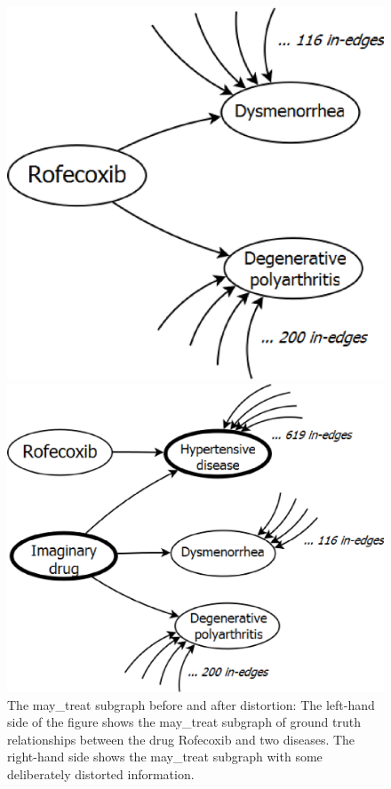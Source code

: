 \begin{figure}[tbh]
\begin{minipage}[c]{0.49\textwidth}\centering
\includegraphics[width=.52\textwidth]{fig/may_treat.eps}
\end{minipage}
\begin{minipage}[c]{0.49\textwidth}\centering
\includegraphics[width=.72\textwidth]{fig/may_treat_augmented.eps}
\end{minipage}
\caption[The may\_treat subgraph]{\label{fig:may_treat} The may\_treat subgraph before and after distortion: The left-hand side of the figure shows the may\_treat subgraph of ground truth relationships between the drug Rofecoxib and two diseases. The right-hand side shows the may\_treat subgraph with some deliberately distorted information.}
\end{figure}

